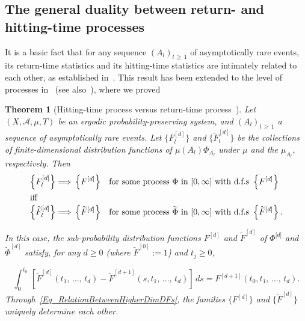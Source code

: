 \documentclass[10pt]{amsart}
\newtheorem{theo}{Theorem}[section]
\theoremstyle{definition}\newtheorem{defi}[theo]{Definition}\newtheorem{rema}[theo]{Remark}\newtheorem{exam}[theo]{Example}\newtheorem{exem}[theo]{Example}\newtheorem{nota}[theo]{Notation}
\newcommand{\clA}{\mathcal{A}}
\begin{document}
\subsection{The general duality between return- and hitting-time processes}
It is a basic fact that for any sequence $(A_{l})_{l\,\geq\,1}$ of asymptotically rare events, its return-time statistics and its hitting-time statistics are intimately related to each other, as established in~\cite{HaydnLacVai05}. This result has been extended to the level of processes in~\cite{Z11} (see also~\cite{Ma}), where we proved

\begin{theo}[{Hitting-time process versus return-time process~\cite{Z11}}]\label{T_HittingTimeVsReturnTimeProc}
Let $(X,\clA,\mu,T)$ be an ergodic probability-preserving system, and $(A_{l})_{l\,\geq\,1}$ a sequence of asymptotically rare events. Let $\{F_{l}^{[d]}\}$ and $\{\widetilde{F} _{l}^{[d]}\}$ be the collections of finite-dimensional distribution functions of $\mu(A_{l})\Phi_{A_{l}}$ under $\mu$ and the $\mu_{A_{l}}$, respectively. Then
\begin{align}
\left\{F_{l}^{[d]}\right\}\Longrightarrow\,\left\{F^{[d]}\right\}\quad &\text{for some process } \Phi\text{ in }[0,\infty]\text{ with d.f.s }\left\{F^{[d]}\right\}\label{Eq_CgeOfHittingProc}
\\
\intertext{iff}
\left\{\widetilde{F}_{l}^{[d]}\right\}\Longrightarrow\,
\left\{\widetilde{F}^{[d]}\right\}\quad &\text{for some process }\widetilde{\Phi}\text{ in }[0,\infty]\text{ with d.f.s }
\left\{\widetilde{F}^{[d]}\right\}.\label{Eq_CgeOfRetProc} 
\end{align}

In this case, the sub-probability distribution functions $F^{[d]}$ and $\widetilde{F}^{[d]}$ of $\Phi^{\lbrack d]}$ and \linebreak$\widetilde{\Phi}^{[d]}$ satisfy, for any $d\geq0$ (where $\widetilde{F}^{[0]}:=1$) and $t_{j}\geq0$,

\begin{equation}\label{Eq_RelationBetweenHigherDimDFs}
{\textstyle\int_{0}^{t_{0}}}
\,\left[\widetilde{F}^{[d]}\left(t_{1},\,\ldots,\,t_{d}\right)-\widetilde{F}^{[d+1]} \left(s,t_{1},\,\ldots,\,t_{d}\right)\right]\,ds=F^{[d+1]}\left(t_{0},t_{1},\,\ldots,\,t_{d}\right).
\end{equation}
Through~\eqref{Eq_RelationBetweenHigherDimDFs}, the families $\{F^{[d]}\}$ and $\{\widetilde{F}^{[d]}\}$ uniquely determine each other.
\end{theo}
\end{document}
